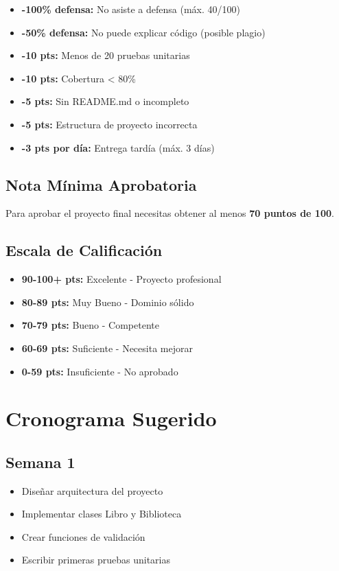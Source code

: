 \documentclass[12pt,a4paper]{article}
\begin{document}
\begin{itemize}[leftmargin=*]
    \item \textbf{-100\% defensa:} No asiste a defensa (máx. 40/100)
    \item \textbf{-50\% defensa:} No puede explicar código (posible plagio)
    \item \textbf{-10 pts:} Menos de 20 pruebas unitarias
    \item \textbf{-10 pts:} Cobertura < 80\%
    \item \textbf{-5 pts:} Sin README.md o incompleto
    \item \textbf{-5 pts:} Estructura de proyecto incorrecta
    \item \textbf{-3 pts por día:} Entrega tardía (máx. 3 días)
\end{itemize}

\subsection{Nota Mínima Aprobatoria}

Para aprobar el proyecto final necesitas obtener al menos \textbf{70 puntos de 100}.

\subsection{Escala de Calificación}

\begin{itemize}
    \item \textbf{90-100+ pts:} Excelente - Proyecto profesional
    \item \textbf{80-89 pts:} Muy Bueno - Dominio sólido
    \item \textbf{70-79 pts:} Bueno - Competente
    \item \textbf{60-69 pts:} Suficiente - Necesita mejorar
    \item \textbf{0-59 pts:} Insuficiente - No aprobado
\end{itemize}

\section{Cronograma Sugerido}

\subsection{Semana 1}
\begin{itemize}[leftmargin=*]
    \item Diseñar arquitectura del proyecto
    \item Implementar clases Libro y Biblioteca
    \item Crear funciones de validación
    \item Escribir primeras pruebas unitarias
\end{itemize}
\end{document}
